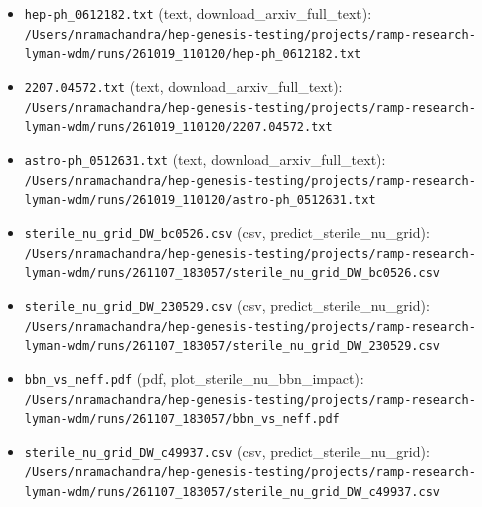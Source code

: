 \documentclass[11pt,a4paper]{article}
\begin{document}
\begin{itemize}
  \item \texttt{hep-ph\_\allowbreak{}0612182.txt} (text, download\_arxiv\_full\_text): \texttt{/\allowbreak{}Users/\allowbreak{}nramachandra/\allowbreak{}hep-genesis-testing/\allowbreak{}projects/\allowbreak{}ramp-research-lyman-wdm/\allowbreak{}runs/\allowbreak{}261019\_\allowbreak{}110120/\allowbreak{}hep-ph\_\allowbreak{}0612182.txt}
  \item \texttt{2207.04572.txt} (text, download\_arxiv\_full\_text): \texttt{/\allowbreak{}Users/\allowbreak{}nramachandra/\allowbreak{}hep-genesis-testing/\allowbreak{}projects/\allowbreak{}ramp-research-lyman-wdm/\allowbreak{}runs/\allowbreak{}261019\_\allowbreak{}110120/\allowbreak{}2207.04572.txt}
  \item \texttt{astro-ph\_\allowbreak{}0512631.txt} (text, download\_arxiv\_full\_text): \texttt{/\allowbreak{}Users/\allowbreak{}nramachandra/\allowbreak{}hep-genesis-testing/\allowbreak{}projects/\allowbreak{}ramp-research-lyman-wdm/\allowbreak{}runs/\allowbreak{}261019\_\allowbreak{}110120/\allowbreak{}astro-ph\_\allowbreak{}0512631.txt}
  \item \texttt{sterile\_\allowbreak{}nu\_\allowbreak{}grid\_\allowbreak{}DW\_\allowbreak{}bc0526.csv} (csv, predict\_sterile\_nu\_grid): \texttt{/\allowbreak{}Users/\allowbreak{}nramachandra/\allowbreak{}hep-genesis-testing/\allowbreak{}projects/\allowbreak{}ramp-research-lyman-wdm/\allowbreak{}runs/\allowbreak{}261107\_\allowbreak{}183057/\allowbreak{}sterile\_\allowbreak{}nu\_\allowbreak{}grid\_\allowbreak{}DW\_\allowbreak{}bc0526.csv}
  \item \texttt{sterile\_\allowbreak{}nu\_\allowbreak{}grid\_\allowbreak{}DW\_\allowbreak{}230529.csv} (csv, predict\_sterile\_nu\_grid): \texttt{/\allowbreak{}Users/\allowbreak{}nramachandra/\allowbreak{}hep-genesis-testing/\allowbreak{}projects/\allowbreak{}ramp-research-lyman-wdm/\allowbreak{}runs/\allowbreak{}261107\_\allowbreak{}183057/\allowbreak{}sterile\_\allowbreak{}nu\_\allowbreak{}grid\_\allowbreak{}DW\_\allowbreak{}230529.csv}
  \item \texttt{bbn\_\allowbreak{}vs\_\allowbreak{}neff.pdf} (pdf, plot\_sterile\_nu\_bbn\_impact): \texttt{/\allowbreak{}Users/\allowbreak{}nramachandra/\allowbreak{}hep-genesis-testing/\allowbreak{}projects/\allowbreak{}ramp-research-lyman-wdm/\allowbreak{}runs/\allowbreak{}261107\_\allowbreak{}183057/\allowbreak{}bbn\_\allowbreak{}vs\_\allowbreak{}neff.pdf}
  \item \texttt{sterile\_\allowbreak{}nu\_\allowbreak{}grid\_\allowbreak{}DW\_\allowbreak{}c49937.csv} (csv, predict\_sterile\_nu\_grid): \texttt{/\allowbreak{}Users/\allowbreak{}nramachandra/\allowbreak{}hep-genesis-testing/\allowbreak{}projects/\allowbreak{}ramp-research-lyman-wdm/\allowbreak{}runs/\allowbreak{}261107\_\allowbreak{}183057/\allowbreak{}sterile\_\allowbreak{}nu\_\allowbreak{}grid\_\allowbreak{}DW\_\allowbreak{}c49937.csv}

\end{itemize}
\end{document}
